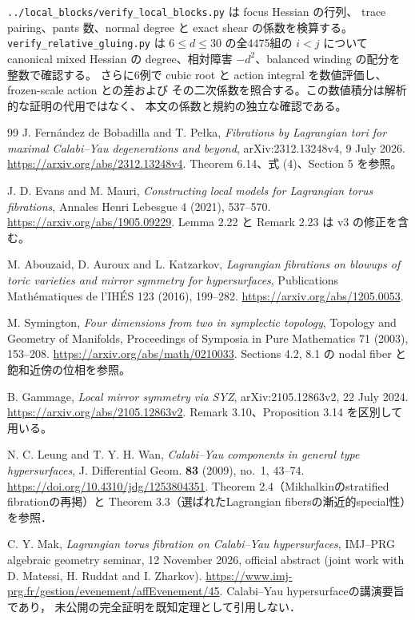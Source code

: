 \documentclass[11pt,a4paper]{article}
\theoremstyle{definition}
\begin{document}
\texttt{../local\_blocks/verify\_local\_blocks.py} は focus Hessian の行列、
trace pairing、pants 数、normal degree と exact shear の係数を検算する。
\texttt{verify\_relative\_gluing.py} は $6\le d\le30$ の全4475組の $i<j$ について
canonical mixed Hessian の degree、相対障害 $-d^2$、balanced winding の配分を整数で確認する。
さらに6例で cubic root と action integral を数値評価し、frozen-scale action との差および
その二次係数を照合する。この数値積分は解析的な証明の代用ではなく、
本文の係数と規約の独立な確認である。

\begin{thebibliography}{99}
J. Fernández de Bobadilla and T. Pełka,
\emph{Fibrations by Lagrangian tori for maximal Calabi--Yau degenerations and beyond},
arXiv:2312.13248v4, 9 July 2026.
\url{https://arxiv.org/abs/2312.13248v4}.
Theorem 6.14、式 (4)、Section 5 を参照。

J. D. Evans and M. Mauri,
\emph{Constructing local models for Lagrangian torus fibrations},
Annales Henri Lebesgue 4 (2021), 537--570.
\url{https://arxiv.org/abs/1905.09229}.
Lemma 2.22 と Remark 2.23 は v3 の修正を含む。

M. Abouzaid, D. Auroux and L. Katzarkov,
\emph{Lagrangian fibrations on blowups of toric varieties and mirror symmetry for hypersurfaces},
Publications Mathématiques de l'IHÉS 123 (2016), 199--282.
\url{https://arxiv.org/abs/1205.0053}.

M. Symington,
\emph{Four dimensions from two in symplectic topology},
Topology and Geometry of Manifolds, Proceedings of Symposia in Pure Mathematics 71 (2003), 153--208.
\url{https://arxiv.org/abs/math/0210033}.
Sections 4.2, 8.1 の nodal fiber と飽和近傍の位相を参照。

B. Gammage, \emph{Local mirror symmetry via SYZ}, arXiv:2105.12863v2, 22 July 2024.
\url{https://arxiv.org/abs/2105.12863v2}.
Remark 3.10、Proposition 3.14 を区別して用いる。

N. C. Leung and T. Y. H. Wan,
\emph{Calabi--Yau components in general type hypersurfaces},
J. Differential Geom. \textbf{83} (2009), no.~1, 43--74.
\url{https://doi.org/10.4310/jdg/1253804351}.
Theorem 2.4（Mikhalkinのstratified fibrationの再掲）と
Theorem 3.3（選ばれたLagrangian fibersの漸近的special性）を参照．

C. Y. Mak,
\emph{Lagrangian torus fibration on Calabi--Yau hypersurfaces},
IMJ--PRG algebraic geometry seminar, 12 November 2026,
official abstract (joint work with D. Matessi, H. Ruddat and I. Zharkov).
\url{https://www.imj-prg.fr/gestion/evenement/affEvenement/45}.
Calabi--Yau hypersurfaceの講演要旨であり，
未公開の完全証明を既知定理として引用しない．


\end{thebibliography}
\end{document}
